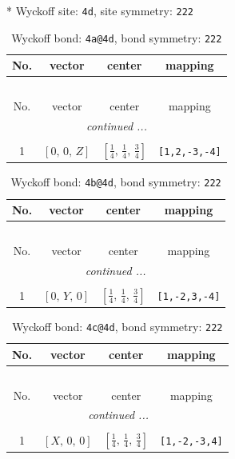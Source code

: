 \documentclass[fleqn,8pt]{jsarticle}
\begin{document}
* Wyckoff site: {\tt 4d}, site symmetry: {\tt 222}
\renewcommand{\arraystretch}{1.2}
\begin{longtable}{cccc}
\caption{Wyckoff bond: {\tt 4a@4d}, bond symmetry: {\tt 222}}
 \\
 \hline \hline
No. & vector & center & mapping \\ \hline \endfirsthead

\multicolumn{3}{l}{\tablename\ \thetable{}} \\
 \hline \hline
No. & vector & center & mapping \\ \hline \endhead

 \hline \hline
\multicolumn{3}{r}{\footnotesize\it continued ...} \\ \endfoot

 \hline \hline
\multicolumn{3}{r}{} \\ \endlastfoot

1 & $\left[ 0,\, 0,\, Z \right]$ & $\left[ \frac{1}{4},\, \frac{1}{4},\, \frac{3}{4} \right]$ & {\tt [1,2,-3,-4]} \\
\end{longtable}
\renewcommand{\arraystretch}{1.2}
\begin{longtable}{cccc}
\caption{Wyckoff bond: {\tt 4b@4d}, bond symmetry: {\tt 222}}
 \\
 \hline \hline
No. & vector & center & mapping \\ \hline \endfirsthead

\multicolumn{3}{l}{\tablename\ \thetable{}} \\
 \hline \hline
No. & vector & center & mapping \\ \hline \endhead

 \hline \hline
\multicolumn{3}{r}{\footnotesize\it continued ...} \\ \endfoot

 \hline \hline
\multicolumn{3}{r}{} \\ \endlastfoot

1 & $\left[ 0,\, Y,\, 0 \right]$ & $\left[ \frac{1}{4},\, \frac{1}{4},\, \frac{3}{4} \right]$ & {\tt [1,-2,3,-4]} \\
\end{longtable}
\renewcommand{\arraystretch}{1.2}
\begin{longtable}{cccc}
\caption{Wyckoff bond: {\tt 4c@4d}, bond symmetry: {\tt 222}}
 \\
 \hline \hline
No. & vector & center & mapping \\ \hline \endfirsthead

\multicolumn{3}{l}{\tablename\ \thetable{}} \\
 \hline \hline
No. & vector & center & mapping \\ \hline \endhead

 \hline \hline
\multicolumn{3}{r}{\footnotesize\it continued ...} \\ \endfoot

 \hline \hline
\multicolumn{3}{r}{} \\ \endlastfoot

1 & $\left[ X,\, 0,\, 0 \right]$ & $\left[ \frac{1}{4},\, \frac{1}{4},\, \frac{3}{4} \right]$ & {\tt [1,-2,-3,4]} \\
\end{longtable}
\end{document}
